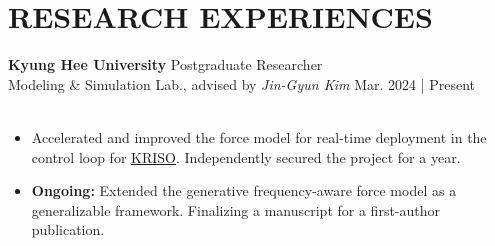 \documentclass[a4paper,10pt]{extarticle}
\begin{document}
\section*{RESEARCH EXPERIENCES}
\noindent\textbf{Kyung Hee University} \hfill Postgraduate Researcher\\
Modeling \& Simulation Lab., advised by \textsl{Jin-Gyun Kim} \hfill Mar. 2024 | Present\\
\vspace*{-0.25cm}\\
\begin{minipage}{0.78\textwidth}
	\footnotesize
	\begin{itemize}
		\item Accelerated and improved the force model for real-time deployment in the control loop for \href{https://www.kriso.re.kr/eng/}{\underline{KRISO}}. Independently secured the project for a year.
		\item \textbf{Ongoing:} Extended the generative frequency-aware force model as a generalizable framework. Finalizing a manuscript for a first-author publication.
	\end{itemize}
\end{minipage}\\

\end{document}
